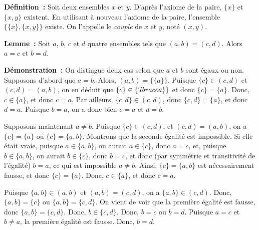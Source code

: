 \noindent\textbf{Définition :} Soit deux ensembles $x$ et $y$. D'après l'axiome de la paire, $\lbrace x \rbrace$ et $\lbrace x, y \rbrace$ existent. En utilisant à nouveau l'axiome de la paire, l'ensemble $\lbrace \lbrace x \rbrace, \lbrace x, y \rbrace \rbrace$ existe. On l'appelle le \textit{couple} de $x$ et $y$, noté $(x,y)$. 

\medskip

\noindent\textbf{Lemme :} Soit $a$, $b$, $c$ et $d$ quatre ensembles tels que $(a,b) = (c,d)$.
    Alors $a = c$ et $b = d$.

\medskip

\noindent\textbf{Démonstration :} On distingue deux cas selon que $a$ et $b$ sont égaux ou non. 
    Supposons d'abord que $a=b$. Alors, $(a,b) = \lbrace \lbrace a \rbrace \rbrace$. 
    Puisque $\lbrace c \rbrace \in (c,d)$ et $(c,d) = (a,b)$, on en déduit que $\lbrace c \rbrace \in \lbrace `lbrace a \rbrace \rbrace$ et donc $\lbrace c \rbrace = \lbrace a \rbrace$.
    Donc, $c \in \lbrace a \rbrace$, et donc $c = a$.
    Par ailleurs, $\lbrace c, d \rbrace \in (c,d)$, donc $\lbrace c, d \rbrace = \lbrace a \rbrace$, et donc $d = a$.
    Puisque $b = a$, on a donc bien $c = a$ et $d = b$.
    
    Supposons maintenant $a \neq b$.
    Puisque $\lbrace c \rbrace \in (c,d)$, et $(c,d) = (a,b)$, on a $\lbrace c \rbrace = \lbrace a \rbrace$ ou $\lbrace c \rbrace = \lbrace a, b \rbrace$.
    Montrons que la seconde égalité est impossible. 
    Si elle était vraie, puisque $a \in \lbrace a, b \rbrace$, on aurait $a \in \lbrace c \rbrace$, donc $a = c$, et, puisque $b \in \lbrace a,b \rbrace$, on aurait $b \in \lbrace c \rbrace$, donc $b = c$, et donc (par symmétrie et transitivité de l'égalité) $b = a$, ce qui est impossible $a \neq b$.
    Ainsi, $\lbrace c \rbrace = \lbrace a, b \rbrace$ est nécessairement fausse, et donc $\lbrace c \rbrace = \lbrace a \rbrace$. 
    Donc, $c \in \lbrace a \rbrace$, et donc $c = a$. 
    
    Puisque $\lbrace a,b \rbrace \in (a,b)$ et $(a,b)=(c,d)$, on a $\lbrace a,b \rbrace \in (c,d)$.
    Donc, $\lbrace a,b \rbrace = \lbrace c \rbrace$ ou $\lbrace a,b \rbrace = \lbrace c, d \rbrace$.
    On vient de voir que la première égalité est fausse, donc $\lbrace a,b \rbrace = \lbrace c, d \rbrace$.
    Donc, $b \in \lbrace c, d \rbrace$. 
    Donc, $b = c$ ou $b = d$. 
    Puisque $a = c$ et $b \neq a$, la première égalité est fausse. 
    Donc, $b = d$. 

   \done 

